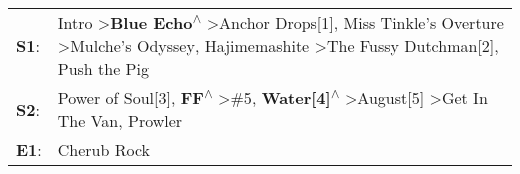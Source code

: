 \begin{supertabular}{p{0.03\textwidth}p{0.92\textwidth}}
 \textbf{S1}:  &  Intro\textsuperscript{} \textgreater \enspace \textbf{Blue Echo\textsuperscript{$\wedge$}} \textgreater \enspace Anchor Drops[1]\textsuperscript{}, \enspace Miss Tinkle's Overture\textsuperscript{} \textgreater \enspace Mulche's Odyssey\textsuperscript{}, \enspace Hajimemashite\textsuperscript{} \textgreater \enspace The Fussy Dutchman[2]\textsuperscript{}, \enspace Push the Pig\textsuperscript{}  \enspace  \\
 \textbf{S2}:  &                                                                                Power of Soul[3]\textsuperscript{}, \enspace \textbf{FF\textsuperscript{$\wedge$}} \textgreater \enspace \#5\textsuperscript{}, \enspace \textbf{Water[4]\textsuperscript{$\wedge$}} \textgreater \enspace August[5]\textsuperscript{} \textgreater \enspace Get In The Van\textsuperscript{}, \enspace Prowler\textsuperscript{}  \enspace  \\
 \textbf{E1}:  &                                                                                                                                                                                                                                                                                                                                                                                    Cherub Rock\textsuperscript{}  \enspace  \\
\end{supertabular}
